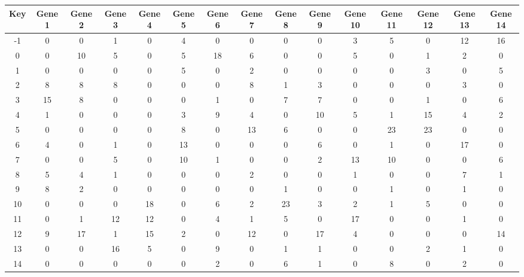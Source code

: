 \begin{tabular}{|c|c|c|c|c|c|c|c|c|c|c|c|c|c|c|}
\hline
Key & Gene 1 & Gene 2 & Gene 3 & Gene 4 & Gene 5 & Gene 6 & Gene 7 & Gene 8 & Gene 9 & Gene 10 & Gene 11 & Gene 12 & Gene 13 & Gene 14 \\
\hline
-1 & 0 & 0 & 1 & 0 & 4 & 0 & 0 & 0 & 0 & 3 & 5 & 0 & 12 & 16 \\
0 & 0 & 10 & 5 & 0 & 5 & 18 & 6 & 0 & 0 & 5 & 0 & 1 & 2 & 0 \\
1 & 0 & 0 & 0 & 0 & 5 & 0 & 2 & 0 & 0 & 0 & 0 & 3 & 0 & 5 \\
2 & 8 & 8 & 8 & 0 & 0 & 0 & 8 & 1 & 3 & 0 & 0 & 0 & 3 & 0 \\
3 & 15 & 8 & 0 & 0 & 0 & 1 & 0 & 7 & 7 & 0 & 0 & 1 & 0 & 6 \\
4 & 1 & 0 & 0 & 0 & 3 & 9 & 4 & 0 & 10 & 5 & 1 & 15 & 4 & 2 \\
5 & 0 & 0 & 0 & 0 & 8 & 0 & 13 & 6 & 0 & 0 & 23 & 23 & 0 & 0 \\
6 & 4 & 0 & 1 & 0 & 13 & 0 & 0 & 0 & 6 & 0 & 1 & 0 & 17 & 0 \\
7 & 0 & 0 & 5 & 0 & 10 & 1 & 0 & 0 & 2 & 13 & 10 & 0 & 0 & 6 \\
8 & 5 & 4 & 1 & 0 & 0 & 0 & 2 & 0 & 0 & 1 & 0 & 0 & 7 & 1 \\
9 & 8 & 2 & 0 & 0 & 0 & 0 & 0 & 1 & 0 & 0 & 1 & 0 & 1 & 0 \\
10 & 0 & 0 & 0 & 18 & 0 & 6 & 2 & 23 & 3 & 2 & 1 & 5 & 0 & 0 \\
11 & 0 & 1 & 12 & 12 & 0 & 4 & 1 & 5 & 0 & 17 & 0 & 0 & 1 & 0 \\
12 & 9 & 17 & 1 & 15 & 2 & 0 & 12 & 0 & 17 & 4 & 0 & 0 & 0 & 14 \\
13 & 0 & 0 & 16 & 5 & 0 & 9 & 0 & 1 & 1 & 0 & 0 & 2 & 1 & 0 \\
14 & 0 & 0 & 0 & 0 & 0 & 2 & 0 & 6 & 1 & 0 & 8 & 0 & 2 & 0 \\
\hline
\end{tabular}